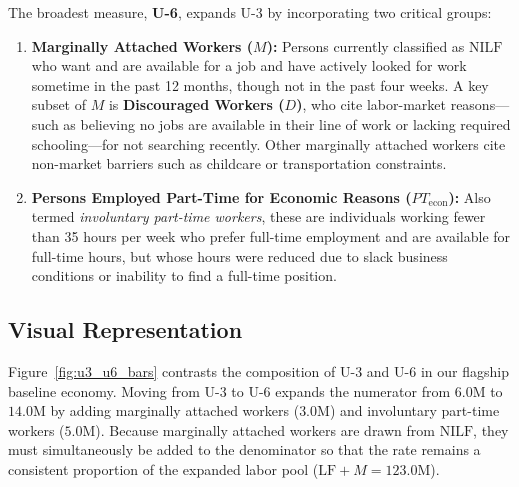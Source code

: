 \documentclass[11pt, a4paper]{article}
\begin{document}
The broadest measure, \textbf{U-6}, expands U-3 by incorporating two critical groups:
\begin{enumerate}[leftmargin=1.5em, itemsep=3pt]
  \item \textbf{Marginally Attached Workers ($M$):} Persons currently classified as $\text{NILF}$ who want and are available for a job and have actively looked for work sometime in the past 12 months, though not in the past four weeks. A key subset of $M$ is \textbf{Discouraged Workers ($D$)}, who cite labor-market reasons—such as believing no jobs are available in their line of work or lacking required schooling—for not searching recently. Other marginally attached workers cite non-market barriers such as childcare or transportation constraints.
  \item \textbf{Persons Employed Part-Time for Economic Reasons ($PT_{\text{econ}}$):} Also termed \textit{involuntary part-time workers}, these are individuals working fewer than 35 hours per week who prefer full-time employment and are available for full-time hours, but whose hours were reduced due to slack business conditions or inability to find a full-time position.
\end{enumerate}

\subsection*{Visual Representation}
Figure~\ref{fig:u3_u6_bars} contrasts the composition of U-3 and U-6 in our flagship baseline economy. Moving from U-3 to U-6 expands the numerator from $6.0\text{M}$ to $14.0\text{M}$ by adding marginally attached workers ($3.0\text{M}$) and involuntary part-time workers ($5.0\text{M}$). Because marginally attached workers are drawn from $\text{NILF}$, they must simultaneously be added to the denominator so that the rate remains a consistent proportion of the expanded labor pool ($\text{LF} + M = 123.0\text{M}$).
\end{document}
